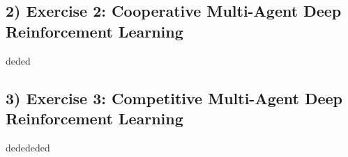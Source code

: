 \documentclass[10pt]{article}
\begin{document}
\subsection*{2) \textbf{ Exercise 2: Cooperative Multi-Agent Deep Reinforcement Learning}}
deded

\subsection*{3) \textbf{ Exercise 3: Competitive Multi-Agent Deep Reinforcement Learning}}
dedededed
\end{document}
